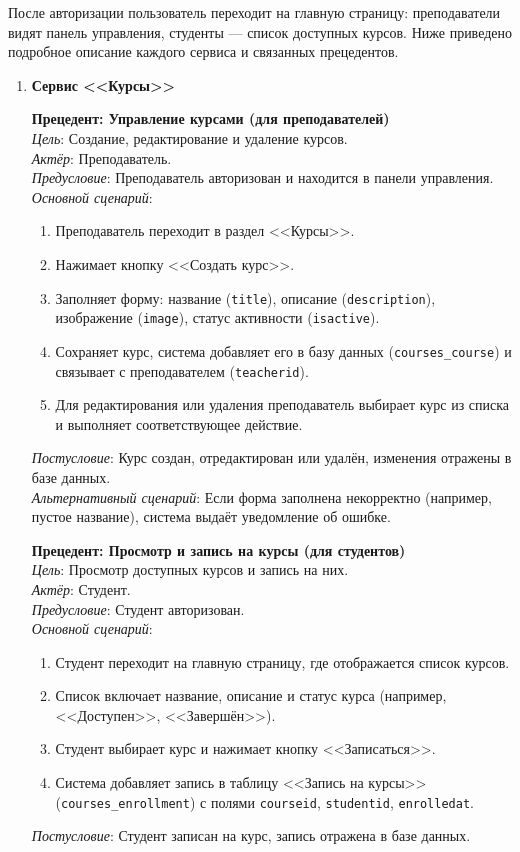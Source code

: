 После авторизации пользователь переходит на главную страницу: преподаватели видят панель управления, студенты --- список доступных курсов. Ниже приведено подробное описание каждого сервиса и связанных прецедентов.

\begin{enumerate}
	\item \textbf{Сервис <<Курсы>>}
	
	\textbf{Прецедент: Управление курсами (для преподавателей)} \\
	\textit{Цель}: Создание, редактирование и удаление курсов. \\
	\textit{Актёр}: Преподаватель. \\
	\textit{Предусловие}: Преподаватель авторизован и находится в панели управления. \\
	\textit{Основной сценарий}:
	\begin{enumerate}
		\item Преподаватель переходит в раздел <<Курсы>>.
		\item Нажимает кнопку <<Создать курс>>.
		\item Заполняет форму: название (\texttt{title}), описание (\texttt{description}), изображение (\texttt{image}), статус активности (\texttt{isactive}).
		\item Сохраняет курс, система добавляет его в базу данных (\texttt{courses\_course}) и связывает с преподавателем (\texttt{teacherid}).
		\item Для редактирования или удаления преподаватель выбирает курс из списка и выполняет соответствующее действие.
	\end{enumerate}
	\textit{Постусловие}: Курс создан, отредактирован или удалён, изменения отражены в базе данных. \\
	\textit{Альтернативный сценарий}: Если форма заполнена некорректно (например, пустое название), система выдаёт уведомление об ошибке.
	
	\textbf{Прецедент: Просмотр и запись на курсы (для студентов)} \\
	\textit{Цель}: Просмотр доступных курсов и запись на них. \\
	\textit{Актёр}: Студент. \\
	\textit{Предусловие}: Студент авторизован. \\
	\textit{Основной сценарий}:
	\begin{enumerate}
		\item Студент переходит на главную страницу, где отображается список курсов.
		\item Список включает название, описание и статус курса (например, <<Доступен>>, <<Завершён>>).
		\item Студент выбирает курс и нажимает кнопку <<Записаться>>.
		\item Система добавляет запись в таблицу <<Запись на курсы>> (\texttt{courses\_enrollment}) с полями \texttt{courseid}, \texttt{studentid}, \texttt{enrolledat}.
	\end{enumerate}
	\textit{Постусловие}: Студент записан на курс, запись отражена в базе данных.
	

\end{enumerate}
